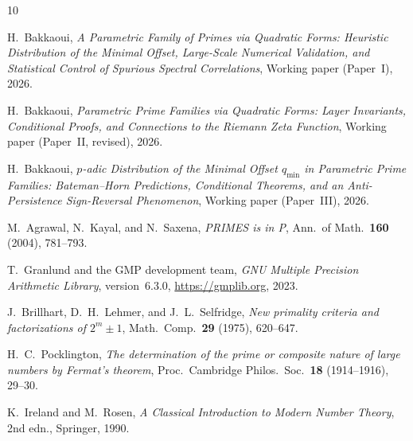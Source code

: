 \documentclass[11pt,a4paper]{article}
\theoremstyle{plain}
\theoremstyle{definition}
\begin{document}
\begin{thebibliography}{10}

 H.~Bakkaoui, \textit{A Parametric Family of Primes via
Quadratic Forms: Heuristic Distribution of the Minimal Offset, Large-Scale
Numerical Validation, and Statistical Control of Spurious Spectral
Correlations}, Working paper (Paper~I), 2026.

 H.~Bakkaoui, \textit{Parametric Prime Families via Quadratic
Forms: Layer Invariants, Conditional Proofs, and Connections to the Riemann
Zeta Function}, Working paper (Paper~II, revised), 2026.

 H.~Bakkaoui, \textit{$p$-adic Distribution of the Minimal
Offset $q_{\min}$ in Parametric Prime Families: Bateman--Horn Predictions,
Conditional Theorems, and an Anti-Persistence Sign-Reversal Phenomenon},
Working paper (Paper~III), 2026.

 M.~Agrawal, N.~Kayal, and N.~Saxena, \textit{PRIMES is in P},
Ann.\ of Math.\ \textbf{160} (2004), 781--793.

 T.~Granlund and the GMP development team, \textit{GNU Multiple
Precision Arithmetic Library}, version~6.3.0,
\url{https://gmplib.org}, 2023.

 J.~Brillhart, D.~H.~Lehmer, and J.~L.~Selfridge,
\textit{New primality criteria and factorizations of $2^m \pm 1$}, Math.\
Comp.\ \textbf{29} (1975), 620--647.

 H.~C.~Pocklington, \textit{The determination of the prime or
composite nature of large numbers by Fermat's theorem}, Proc.\ Cambridge
Philos.\ Soc.\ \textbf{18} (1914--1916), 29--30.

 K.~Ireland and M.~Rosen, \textit{A Classical
Introduction to Modern Number Theory}, 2nd edn., Springer, 1990.

\end{thebibliography}
\end{document}
